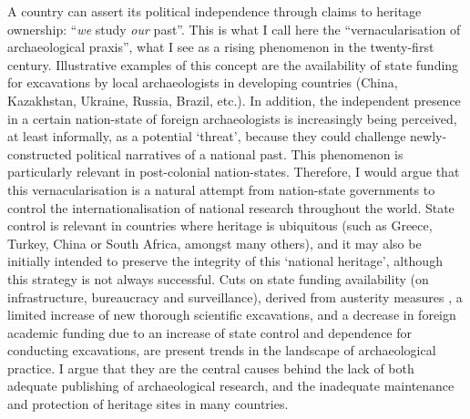         A country can assert its political independence through claims to heritage ownership: “\emph{we} study \emph{our} past”. This is what I call here the “vernacularisation of archaeological praxis”, what I see as a rising phenomenon in the twenty-first century. 
        Illustrative examples of this concept are the availability of state funding for excavations by local archaeologists in developing countries (China, Kazakhstan, Ukraine, Russia, Brazil, etc.). In addition, the independent presence in a certain nation-state of foreign archaeologists is increasingly being perceived, at least informally, as a potential ‘threat’, because they could challenge newly-constructed political narratives of a national past. This phenomenon is particularly relevant in post-colonial nation-states.
        Therefore, I would argue that this vernacularisation is a natural attempt from nation-state governments to control the internationalisation of national research throughout the world. State control is relevant in countries where heritage is ubiquitous (such as Greece, Turkey, China or South Africa, amongst many others), and it may also be initially intended to preserve the integrity of this ‘national heritage’, although this strategy is not always successful. Cuts on state funding availability (on infrastructure, bureaucracy and surveillance), derived from austerity measures \parencite{Phillips_2012}, a limited increase of new thorough scientific excavations, and a decrease in foreign academic funding due to an increase of state control and dependence for conducting excavations, are present trends in the landscape of archaeological practice. I argue that they are the central causes behind the lack of both adequate publishing of archaeological research, and the inadequate maintenance and protection of heritage sites in many countries.
		
